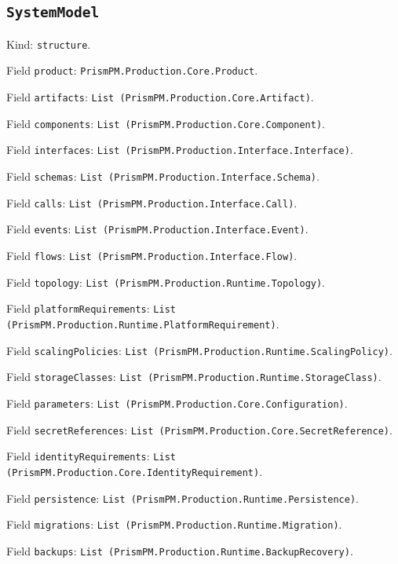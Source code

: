 \documentclass[11pt]{article}
\begin{document}
\subsection*{\texttt{SystemModel}}
\noindent Kind: \texttt{structure}.\par
\noindent Field \texttt{product}: \texttt{PrismPM.Production.Core.Product}.\par
\noindent Field \texttt{artifacts}: \texttt{List (PrismPM.Production.Core.Artifact)}.\par
\noindent Field \texttt{components}: \texttt{List (PrismPM.Production.Core.Component)}.\par
\noindent Field \texttt{interfaces}: \texttt{List (PrismPM.Production.Interface.Interface)}.\par
\noindent Field \texttt{schemas}: \texttt{List (PrismPM.Production.Interface.Schema)}.\par
\noindent Field \texttt{calls}: \texttt{List (PrismPM.Production.Interface.Call)}.\par
\noindent Field \texttt{events}: \texttt{List (PrismPM.Production.Interface.Event)}.\par
\noindent Field \texttt{flows}: \texttt{List (PrismPM.Production.Interface.Flow)}.\par
\noindent Field \texttt{topology}: \texttt{List (PrismPM.Production.Runtime.Topology)}.\par
\noindent Field \texttt{platformRequirements}: \texttt{List (PrismPM.Production.Runtime.PlatformRequirement)}.\par
\noindent Field \texttt{scalingPolicies}: \texttt{List (PrismPM.Production.Runtime.ScalingPolicy)}.\par
\noindent Field \texttt{storageClasses}: \texttt{List (PrismPM.Production.Runtime.StorageClass)}.\par
\noindent Field \texttt{parameters}: \texttt{List (PrismPM.Production.Core.Configuration)}.\par
\noindent Field \texttt{secretReferences}: \texttt{List (PrismPM.Production.Core.SecretReference)}.\par
\noindent Field \texttt{identityRequirements}: \texttt{List (PrismPM.Production.Core.IdentityRequirement)}.\par
\noindent Field \texttt{persistence}: \texttt{List (PrismPM.Production.Runtime.Persistence)}.\par
\noindent Field \texttt{migrations}: \texttt{List (PrismPM.Production.Runtime.Migration)}.\par
\noindent Field \texttt{backups}: \texttt{List (PrismPM.Production.Runtime.BackupRecovery)}.\par
\end{document}
